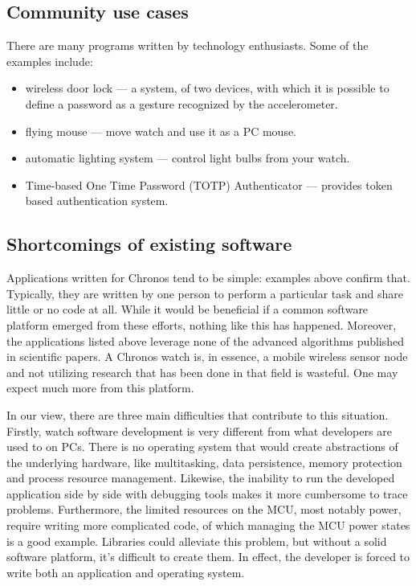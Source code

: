 \subsection{Community use cases}
There are many programs written by technology enthusiasts. Some of the
examples include:

\begin{itemize}
  \item wireless door lock --- a system, of two devices, with which it
    is possible to define a password as a gesture recognized by the
    accelerometer.
  \item flying mouse --- move watch and use it as a PC mouse.
  \item automatic lighting system --- control light bulbs from your
    watch.
  \item Time-based One Time Password (TOTP) Authenticator --- provides
    token based authentication system. %
\end{itemize}

\subsection{Shortcomings of existing software}

Applications written for Chronos tend to be simple: examples above
confirm that. Typically, they are written by one person to perform a
particular task and share little or no code at all.  While it would be
beneficial if a common software platform emerged from these efforts,
nothing like this has happened. Moreover, the applications listed
above leverage none of the advanced algorithms published in
scientific papers. A Chronos watch is, in essence, a mobile wireless
sensor node and not utilizing research that has been done in
that field is wasteful. One may expect much more from this platform.

In our view, there are three main difficulties that contribute to this
situation.  Firstly, watch software development is very different from
what developers are used to on PCs. There is no operating system
that would create abstractions of the underlying hardware, like
multitasking, data persistence, memory protection and process resource
management.  Likewise, the inability to run the developed application side by
side with debugging tools makes it more cumbersome to trace problems.
Furthermore, the limited resources on the MCU, most notably power, require writing more
complicated code, of which managing the MCU power states is a good example.
Libraries could alleviate this problem, but without a solid software
platform, it's difficult to create them. In effect, the developer is forced
to write both an application and operating system.

